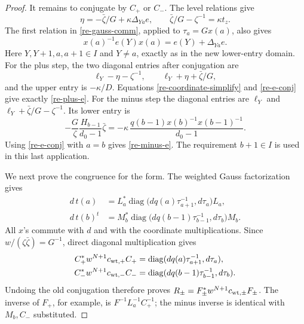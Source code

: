 \begin{proof}
It remains to conjugate by \(C_+\) or \(C_-\).
The level relations give
\begin{equation}
 \eta=-\bar\zeta/G+\kappa\Delta_{Ya}e,\qquad
 \bar\zeta/G-\zeta^{-1}=\kappa t_z .
                                                               \label{re-coordinate-simplify}
\end{equation}
The first relation in \eqref{re-gauss-comm}, applied to
\(\tau_a=Gx(a)\), also gives
\begin{equation}
               x(a)^{-1}e(Y)x(a)=e(Y)+\Delta_{Ya}e.
                                                               \label{re-e-conj}
\end{equation}
Here \(Y,Y+1,a,a+1\in I\) and \(Y\ne a\), exactly as in the
new lower-entry domain.
For the plus step, the two diagonal entries after conjugation
are
\[
 \ell_Y-\eta-\zeta^{-1},\qquad
 \ell_Y+\eta+\bar\zeta/G,
\]
and the upper entry is \(-\kappa/D\).
Equations \eqref{re-coordinate-simplify} and
\eqref{re-e-conj} give exactly \eqref{re-plus-e}.
For the minus step the diagonal entries are
\(\ell_Y\) and \(\ell_Y+\bar\zeta/G-\zeta^{-1}\).
Its lower entry is
\[
 -\frac{G}{\zeta}\frac{H_{b-1}}{d_0-1}\bar\zeta
 =-\kappa\,\frac{q(b-1)x(b)^{-1}x(b-1)^{-1}}{d_0-1}.
\]
Using \eqref{re-e-conj} with \(a=b\) gives
\eqref{re-minus-e}.  The requirement \(b+1\in I\) is used
in this last application.

We next prove the congruence for the form.  The weighted
Gauss factorization gives
\begin{align*}
 d\,t(a)
 &=L_a^*\operatorname{diag}
       \bigl(dq(a)\tau_{a+1}^{-1},d\tau_a\bigr)L_a,\\
 d\,t(b)^t
 &=M_b^*\operatorname{diag}
       \bigl(dq(b-1)\tau_{b-1}^{-1},d\tau_b\bigr)M_b.
\end{align*}
All \(x\)'s commute with \(d\) and with the coordinate
multiplications.  Since
\(w/(\zeta\bar\zeta)=G^{-1}\), direct diagonal multiplication
gives
\begin{align*}
 C_+^*w^{N+1}c_{{\rm wt},+}C_+
 &=\operatorname{diag}(dq(a)\tau_{a+1}^{-1},d\tau_a),\\
 C_-^*w^{N+1}c_{{\rm wt},-}C_-
 &=\operatorname{diag}(dq(b-1)\tau_{b-1}^{-1},d\tau_b).
\end{align*}
Undoing the old conjugation therefore proves
\(R_\pm=F_\pm^*w^{N+1}c_{{\rm wt},\pm}F_\pm\).
The inverse of \(F_+\), for example, is
\(F^{-1}L_a^{-1}C_+^{-1}\); the minus inverse is identical
with \(M_b,C_-\) substituted.


\end{proof}
